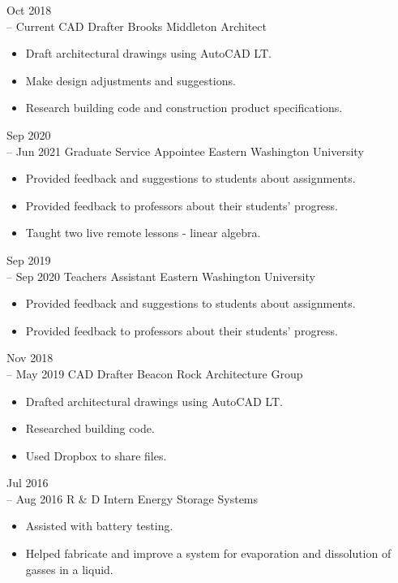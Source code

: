 \documentclass[11pt]{developercv} %
\newcommand{\vsp}{\vspace{-10pt}}
\begin{document}
\begin{entrylist}
	\entry
		{Oct 2018 \\
		-- Current}
		{CAD Drafter}
		{Brooks Middleton Architect}
		{\vspace{-0.5cm}\begin{itemize}
			\item Draft architectural drawings using AutoCAD LT.
			\item Make design adjustments and suggestions.
			\item Research building code and construction product specifications.
		\end{itemize}}
	\entry
		{Sep 2020 \\
		-- Jun 2021}
		{Graduate Service Appointee}
		{Eastern Washington University}
		{\vspace{-0.5cm}\begin{itemize}
			\item Provided feedback and suggestions to students about assignments. 
			\item Provided feedback to professors about their students' progress. 
			\item Taught two live remote lessons - linear algebra.
		\end{itemize}}
	\entry
		{Sep 2019 \\
		-- Sep 2020}
		{Teachers Assistant}
		{Eastern Washington University}
		{\vspace{-0.5cm}\begin{itemize}
			\item Provided feedback and suggestions to students about assignments. 
			\item Provided feedback to professors about their students' progress. 
		\end{itemize}}
	\entry
		{Nov 2018 \\
		-- May 2019}
		{CAD Drafter}
		{Beacon Rock Architecture Group}
		{\vspace{-0.5cm}\begin{itemize}
			\item Drafted architectural drawings using AutoCAD LT.
			\item Researched building code.
			\item Used Dropbox to share files.
		\end{itemize}}
	\entry
		{Jul 2016 \\
		-- Aug 2016}
		{R \& D Intern}
		{Energy Storage Systems}
		{\vspace{-0.5cm}\begin{itemize}
			\item Assisted with battery testing.
			\item Helped fabricate and improve a system for evaporation and dissolution of gasses in a liquid.
		\end{itemize}}
\end{entrylist}
\vsp
\end{document}
